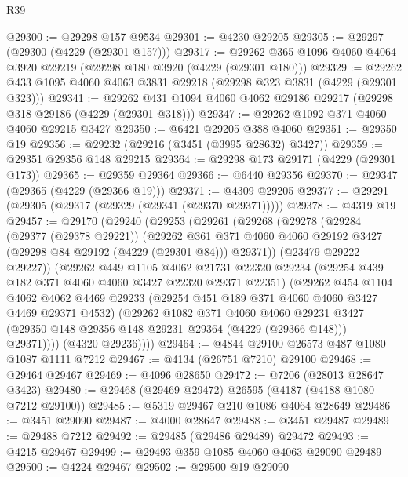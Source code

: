 \begin{lexlean}{R39}
\begin{coremodule}
@29300 := @29298 @157 @9534
@29301 := @4230 @29205
@29305 := @29297 (@29300 (@4229 (@29301 @157)))
@29317 := @29262 @365 @1096 @4060 @4064 @3920 @29219 (@29298 @180 @3920 (@4229 (@29301 @180)))
@29329 := @29262 @433 @1095 @4060 @4063 @3831 @29218 (@29298 @323 @3831 (@4229 (@29301 @323)))
@29341 := @29262 @431 @1094 @4060 @4062 @29186 @29217 (@29298 @318 @29186 (@4229 (@29301 @318)))
@29347 := @29262 @1092 @371 @4060 @4060 @29215 @3427
@29350 := @6421 @29205 @388 @4060
@29351 := @29350 @19
@29356 := @29232 (@29216 (@3451 (@3995 @28632) @3427))
@29359 := @29351 @29356 @148 @29215
@29364 := @29298 @173 @29171 (@4229 (@29301 @173))
@29365 := @29359 @29364
@29366 := @6440 @29356
@29370 := @29347 (@29365 (@4229 (@29366 @19)))
@29371 := @4309 @29205
@29377 := @29291 (@29305 (@29317 (@29329 (@29341 (@29370 @29371)))))
@29378 := @4319 @19
@29457 := @29170
    (@29240
      (@29253
        (@29261
          (@29268
            (@29278
              (@29284
                (@29377 (@29378 @29221))
                (@29262
                  @361
                  @371
                  @4060
                  @4060
                  @29192
                  @3427
                  (@29298 @84 @29192 (@4229 (@29301 @84)))
                  @29371))
              (@23479 @29222 @29227))
            (@29262
              @449
              @1105
              @4062
              @21731
              @22320
              @29234
              (@29254 @439 @182 @371 @4060 @4060 @3427 @22320 @29371 @22351)
              (@29262
                @454
                @1104
                @4062
                @4062
                @4469
                @29233
                (@29254 @451 @189 @371 @4060 @4060 @3427 @4469 @29371 @4532)
                (@29262
                  @1082
                  @371
                  @4060
                  @4060
                  @29231
                  @3427
                  (@29350 @148 @29356 @148 @29231 @29364 (@4229 (@29366 @148)))
                  @29371))))
          (@4320 @29236))))
@29464 := @4844 @29100 @26573 @487 @1080 @1087 @1111 @7212
@29467 := @4134 (@26751 @7210) @29100
@29468 := @29464 @29467
@29469 := @4096 @28650
@29472 := @7206 (@28013 @28647 @3423)
@29480 := @29468 (@29469 @29472) @26595 (@4187 (@4188 @1080 @7212 @29100))
@29485 := @5319 @29467 @210 @1086 @4064 @28649
@29486 := @3451 @29090
@29487 := @4000 @28647
@29488 := @3451 @29487
@29489 := @29488 @7212
@29492 := @29485 (@29486 @29489) @29472
@29493 := @4215 @29467
@29499 := @29493 @359 @1085 @4060 @4063 @29090 @29489
@29500 := @4224 @29467
@29502 := @29500 @19 @29090

\end{coremodule}
\end{lexlean}
